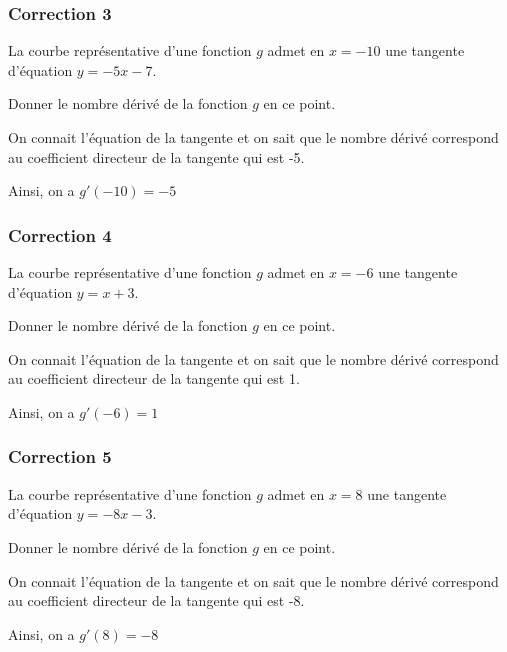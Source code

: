 \documentclass[15pt, mathserif]{beamer}
\begin{document}
\begin{frame}
\vspace{-10mm}
	\frametitle{Correction 3}
La courbe représentative d'une fonction $g$ admet en $x=-10$ une tangente d'équation $y=-5x-7$.
 
  Donner le nombre dérivé de la fonction $g$ en ce point. 
 
 On connait l'équation de la tangente et on sait que le nombre dérivé correspond au coefficient directeur de la tangente qui est -5. 
 
 Ainsi, on a $g'(-10)=-5$\end{frame}


\begin{frame}
\vspace{-10mm}
	\frametitle{Correction 4}
La courbe représentative d'une fonction $g$ admet en $x=-6$ une tangente d'équation $y=x+3$.
 
  Donner le nombre dérivé de la fonction $g$ en ce point. 
 
 On connait l'équation de la tangente et on sait que le nombre dérivé correspond au coefficient directeur de la tangente qui est 1. 
 
 Ainsi, on a $g'(-6)=1$\end{frame}


\begin{frame}
\vspace{-10mm}
	\frametitle{Correction 5}
La courbe représentative d'une fonction $g$ admet en $x=8$ une tangente d'équation $y=-8x-3$.
 
  Donner le nombre dérivé de la fonction $g$ en ce point. 
 
 On connait l'équation de la tangente et on sait que le nombre dérivé correspond au coefficient directeur de la tangente qui est -8. 
 
 Ainsi, on a $g'(8)=-8$\end{frame}
\end{document}

